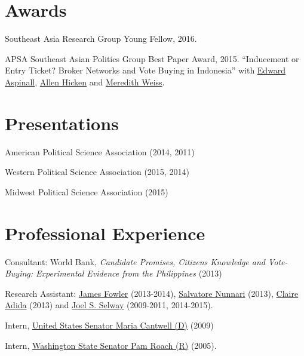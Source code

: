 \documentclass[letterpaper]{article}
\renewenvironment{itemize}{
  \begin{list}{}{
    \setlength{\leftmargin}{1.5em}
  }
}{
  \end{list}
}
\begin{document}
\section*{Awards}
\begin{itemize}
  \item Southeast Asia Research Group Young Fellow, 2016. 
\end{itemize}

\begin{itemize}
  \item APSA Southeast Asian Politics Group Best Paper Award, 2015. ``Inducement or Entry Ticket? Broker Networks and Vote Buying in Indonesia'' with \href{https://researchers.anu.edu.au/researchers/aspinall-et}{Edward Aspinall}, \href{http://www.allenhicken.com/}{Allen Hicken} and \href{http://www.albany.edu/rockefeller/faculty_pos_weiss.shtml}{Meredith Weiss}.
\end{itemize}


\section*{Presentations}
\begin{itemize}
  \item American Political Science Association (2014, 2011)
  \item Western Political Science Association (2015, 2014)
  \item Midwest Political Science Association (2015)
\end{itemize}

\section*{Professional Experience}

\begin{itemize}
\item Consultant: World Bank, \emph{Candidate Promises, Citizens Knowledge and Vote-Buying: Experimental Evidence from the Philippines} (2013)
\item Research Assistant:
  \href{http://jhfowler.ucsd.edu/}{James Fowler} (2013-2014),
  \href{http://polisci2.ucsd.edu/snunnari/}{Salvatore Nunnari} (2013),
  \href{http://polisci2.ucsd.edu/cadida/Site/Welcome.html}{Claire
    Adida} (2013)
  and 
  \href{http://fhssfaculty.byu.edu/FacultyPage.aspx?id=jss83}{Joel
    S. Selway} (2009-2011, 2014-2015).
\item Intern, \href{cantwell.senate.gov}{United States Senator Maria
    Cantwell (D)} (2009)

\item Intern, \href{http://www.leg.wa.gov/senate/senators/Pages/roach.aspx}{Washington
    State Senator Pam Roach (R)} (2005).
\end{itemize}
\end{document}
